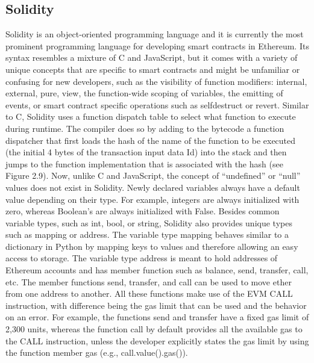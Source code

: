     \subsection{Solidity}
        Solidity is an object-oriented programming language and it is currently the most prominent programming language for developing smart contracts in Ethereum.
        Its syntax resembles a mixture of C and JavaScript, but it comes with a variety of unique concepts that are specific to smart contracts and might be unfamiliar or confusing for new developers, such as the visibility of function modifiers: internal, external, pure, view, the function-wide scoping of variables, the emitting of events, or smart contract specific operations such as selfdestruct or revert.
        Similar to C, Solidity uses a function dispatch table to select what function to execute during runtime.
        The compiler does so by adding to the bytecode a function dispatcher that first loads the hash of the name of the function to be executed (the initial 4 bytes of the transaction input data Id) into the stack and then jumps to the function implementation that is associated with the hash (see Figure 2.9).
        Now, unlike C and JavaScript, the concept of “undefined” or “null” values does not exist in Solidity.
        Newly declared variables always have a default value depending on their type.
        For example, integers are always initialized with zero, whereas Boolean's are always initialized with False.
        Besides common variable types, such as int, bool, or string, Solidity also provides unique types such as mapping or address.
        The variable type mapping behaves similar to a dictionary in Python by mapping keys to values and therefore allowing an easy access to storage.
        The variable type address is meant to hold addresses of Ethereum accounts and has member function such as balance, send, transfer, call, etc.
        The member functions send, transfer, and call can be used to move ether from one address to another.
        All these functions make use of the EVM CALL instruction, with difference being the gas limit that can be used and the behavior on an error.
        For example, the functions send and transfer have a fixed gas limit of 2,300 units, whereas the function call by default provides all the available gas to the CALL instruction, unless the developer explicitly states the gas limit by using the function member gas (e.g., call.value().gas()).

